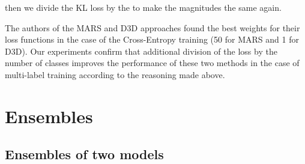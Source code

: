 \documentclass[conference]{IEEEtran}
\begin{document}
then we divide the KL loss by the  to make the magnitudes the same again.

The authors of the MARS and D3D approaches found the best weights for their loss functions in the case of the Cross-Entropy training (50 for MARS and 1 for D3D).  Our experiments confirm that additional division of the loss by the number of classes improves the performance of these two methods in the case of multi-label training according to the reasoning made above.

\section{Ensembles}

\subsection{Ensembles of two models} \label{app:b1}
\end{document}
